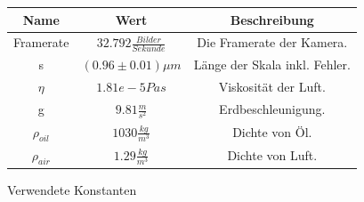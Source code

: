 \documentclass{scrartcl}
\begin{document}
                    \begin{figure}[H]
                        \centering
                        \begin{tabular}{c|c|c}
                            \hline
                            Name & Wert & Beschreibung \\
                            \hline
                            Framerate & $32.792 \frac{Bilder}{Sekunde}$ & Die Framerate der Kamera.\\ 
                            s & $(0.96\pm 0.01) \mu m$ & Länge der Skala inkl. Fehler.\\
                            $\eta$ & $1.81e-5 Pas$ & Viskosität der Luft.\\
                            g & $9.81 \frac{m}{s^2}$ & Erdbeschleunigung.\\
                            $\rho_{oil}$ & $1030 \frac{kg}{m^3}$ & Dichte von Öl.\\
                            $\rho_{air}$ & $1.29 \frac{kg}{m^3}$ & Dichte von Luft.\\
                        \end{tabular}
                        \caption{Verwendete Konstanten}
                        \label{konstanten}
                    \end{figure}
\end{document}
